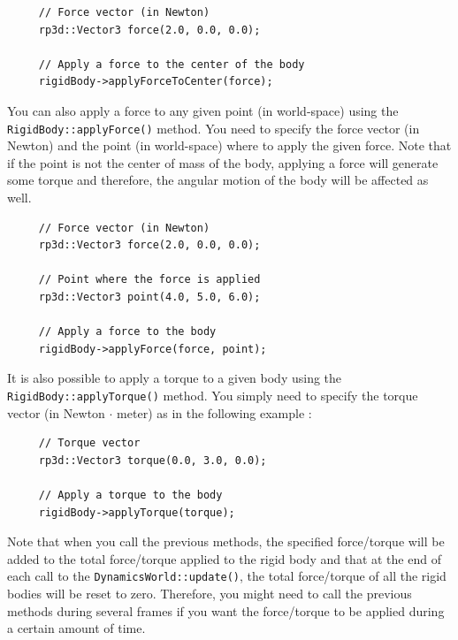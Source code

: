 \documentclass[a4paper,12pt]{article}
\begin{document}
    \begin{lstlisting}
     // Force vector (in Newton)
     rp3d::Vector3 force(2.0, 0.0, 0.0);
 
     // Apply a force to the center of the body
     rigidBody->applyForceToCenter(force);
  \end{lstlisting}

    \vspace{0.6cm}

    \begin{sloppypar}
        You can also apply a force to any given point (in world-space) using the \texttt{RigidBody::applyForce()} method. You need to specify the force vector (in Newton) and the point
        (in world-space) where to apply the given force. Note that if the point is not the center of mass of the body, applying a force will generate some torque and therefore, the
        angular motion of the body will be affected as well. \\
    \end{sloppypar}

    \begin{lstlisting}
     // Force vector (in Newton)
     rp3d::Vector3 force(2.0, 0.0, 0.0);

     // Point where the force is applied
     rp3d::Vector3 point(4.0, 5.0, 6.0);
 
     // Apply a force to the body
     rigidBody->applyForce(force, point);
  \end{lstlisting}

    \vspace{0.6cm}

     \begin{sloppypar}
        It is also possible to apply a torque to a given body using the \texttt{RigidBody::applyTorque()} method. You simply need to specify the torque vector (in Newton $\cdot$ meter) as
        in the following example : \\
     \end{sloppypar}

    \begin{lstlisting}
     // Torque vector
     rp3d::Vector3 torque(0.0, 3.0, 0.0);

     // Apply a torque to the body
     rigidBody->applyTorque(torque);
  \end{lstlisting}

    \vspace{0.6cm}

    Note that when you call the previous methods, the specified force/torque will be added to the total force/torque applied to the rigid body and that at the end of each call to the
    \texttt{DynamicsWorld::update()}, the total force/torque of all the rigid bodies will be reset to zero. Therefore, you might need to call the previous methods during several frames
    if you want the force/torque to be applied during a certain amount of time.
\end{document}
